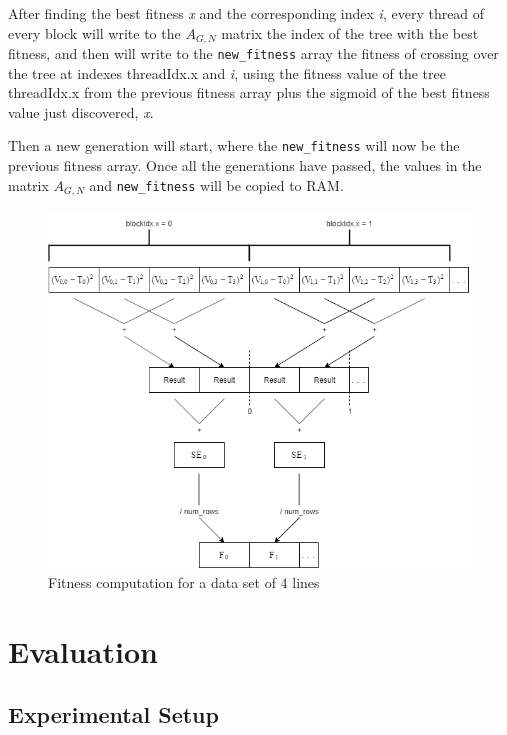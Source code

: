 \documentclass[runningheads]{llncs}
\begin{document}
After finding the best fitness \textit{x} and the corresponding index \textit{i}, every thread of every block will write to the $A_{G,N}$ matrix the index of the tree with the best fitness, and then will write to the \texttt{new\_fitness} array the fitness of crossing over the tree at indexes threadIdx.x and \textit{i}, using the fitness value of the tree threadIdx.x from the previous fitness array plus the sigmoid of the best fitness value just discovered, \textit{x}.

Then a new generation will start, where the \texttt{new\_fitness} will now be the previous fitness array. Once all the generations have passed, the values in the matrix $A_{G,N}$ and \texttt{new\_fitness} will be copied to RAM.

\begin{figure}[!htb]
\begin{center}
\includegraphics[scale=0.35]{Fitness_Calculation1}
\end{center}
\caption{Fitness computation for a data set of 4 lines}
\label{fitness_calc}
\end{figure}

\section{Evaluation}

\subsection{Experimental Setup}
\end{document}
